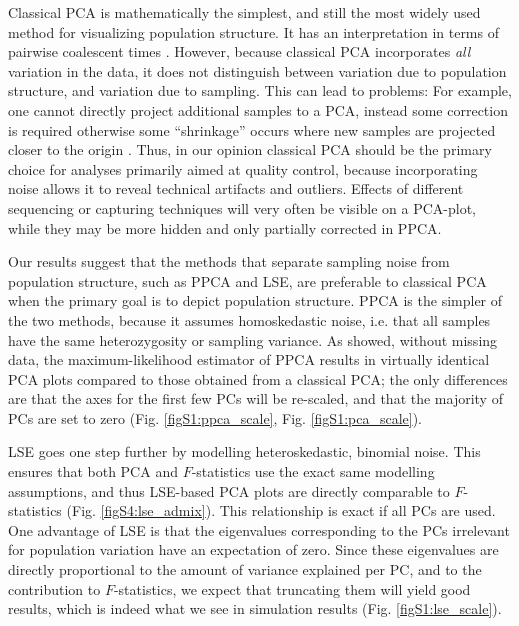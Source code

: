 \documentclass[12pt]{article}
\begin{document}
Classical PCA is mathematically the simplest, and still the most widely used method for visualizing population structure. It has an interpretation in terms of pairwise coalescent times \citep{mcvean_genealogical_2009}. However, because classical PCA incorporates \emph{all} variation in the data, it does not distinguish between variation due to population structure, and variation due to sampling. This can lead to problems: For example, one cannot directly project additional samples to a PCA, instead some correction is required otherwise some ``shrinkage'' occurs where new samples are projected closer to the origin \citep{patterson_population_2006, wang_improved_2015}. Thus, in our opinion classical PCA should be the primary choice for analyses primarily aimed at quality control, because incorporating noise allows it to reveal technical artifacts and outliers. Effects of different sequencing or capturing techniques will very often be visible on a PCA-plot, while they may be more hidden and only partially corrected in PPCA.

Our results suggest that the methods that separate sampling noise from population structure, such as PPCA and LSE, are preferable to classical PCA when the primary goal is to depict population structure. PPCA is the simpler of the two methods, because it assumes homoskedastic noise, i.e. that all samples have the same heterozygosity or sampling variance. As \cite{tipping_probabilistic_1999-1} showed, without missing data, the maximum-likelihood estimator of PPCA results in virtually identical PCA plots compared to those obtained from a classical PCA; the only differences are that the axes for the first few PCs will be re-scaled, and that the majority of PCs are set to zero (Fig. \ref{figS1:ppca_scale}, Fig. \ref{figS1:pca_scale}).


LSE goes one step further by modelling heteroskedastic, binomial noise. This ensures that both PCA and $F$-statistics use the exact same modelling assumptions, and thus LSE-based PCA plots are directly comparable to $F$-statistics (Fig. \ref{figS4:lse_admix}). This relationship is exact if all PCs are used. One advantage of LSE is that the eigenvalues corresponding to the PCs irrelevant for population variation have an expectation of zero. Since these eigenvalues are directly proportional to the amount of variance explained per PC, and to the contribution to $F$-statistics, we expect that truncating them will yield good results, which is indeed what we see in simulation results (Fig. \ref{figS1:lse_scale}). 
\end{document}
